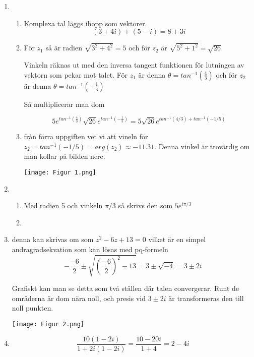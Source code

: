 \documentclass[a4paper,12pt]{article}
\begin{document}
\begin{enumerate}
    \item \begin{enumerate}
              \item Komplexa tal läggs ihopp som vektorer.
                    $$(3+4i)+(5-i)=8+3i$$
              \item För $z_1$ så är radien $\sqrt{3^2+4^2}=5$ och för
                    $z_2$ är $\sqrt{5^2+1^2}=\sqrt{26}$

                    Vinkeln räknas ut med den inversa tangent funktionen
                    för lutningen av vektorn som pekar mot talet.
                    För $z_1$ är denna $\theta = tan^{-1}(\frac{4}{3})$
                    och för $z_2$ är denna $\theta = tan^{-1}(-\frac{1}{5})$

                  Så multiplicerar man dom

                  $$5e^{tan^{-1}(\frac{4}{3})}\sqrt{26}e^{tan^{-1}(-\frac{1}{5})}=5\sqrt{26}e^{tan^{-1}(4/3)+tan^{-1}(-1/5)}$$

                  \item från förra uppgiften vet vi att vineln för $z_2=tan^{-1}(-1/5)=arg(z_2)\approx -11.31$.
                  Denna vinkel är trovärdig om man kollar på bilden nere.
                  
                  \begin{center}
                        \texttt{[image: Figur 1.png]}
                  \end{center}

          \end{enumerate}
          \item \begin{enumerate}
                \item Med radien 5 och vinkeln $\pi/3$ så 
                skrivs den som $5e^{i\pi/3}$

                \item 
          \end{enumerate}

          \item denna kan skrivas om som 
          $z^2-6z+13=0$ vilket är en simpel andragradsekvation som
          kan lösas med pq-formeln 
          $$-\frac{-6}{2}\pm\sqrt{(\frac{-6}{2})^2-13}=3\pm\sqrt{-4}=3\pm 2i$$
          
          Grafiskt kan man se detta som två ställen där talen convergerar.
          Runt de områderna är dom nära noll, och presis vid $3\pm 2i$ är 
          transformeras den till noll punkten.
          \begin{center}
                \texttt{[image: Figur 2.png]}
          \end{center}
          \item 
          $$\frac{10(1-2i)}{1+2i(1-2i)}=\frac{10-20i}{1+4}=2-4i$$


\end{enumerate}
\end{document}

